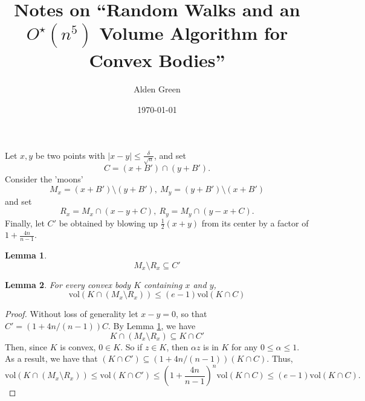 \documentclass{article}
\newcommand{\abs}[1]{\left \lvert #1 \right \rvert}
\newcommand{\vol}{\mathrm{vol}}
\newcommand{\1}{\mathbf{1}}
\theoremstyle{alden}
\theoremstyle{aldenthm}
\newtheorem{lemma}{Lemma}
\theoremstyle{remark}
\begin{document}
	
\title{Notes on ``Random Walks and an $O^{\star}(n^5)$ Volume Algorithm for Convex Bodies''}
\author{Alden Green}
\date{\today}
\maketitle

Let $x,y$ be two points with $\abs{x - y} \leq \frac{\delta}{\sqrt{n}}$, and set
\begin{equation*}
C = (x + B') \cap (y + B'). \tag{$B' = \delta B$}
\end{equation*}
Consider the 'moons'
\begin{equation*}
M_x = (x + B') \setminus (y + B'),~ M_y = (y + B') \setminus (x + B')
\end{equation*}
and set
\begin{equation*}
R_x = M_x \cap (x - y + C),~ R_y = M_y \cap(y - x + C).
\end{equation*}
Finally, let $C'$ be obtained by blowing up $\frac{1}{2}(x + y)$ from its center by a factor of $1 + \frac{4n}{n - 1}$. 

\begin{lemma}
	\label{lem: large_intersection_1}
	\begin{equation*}
	M_x \setminus R_x \subseteq C'
	\end{equation*}
\end{lemma}


\begin{lemma}
	\label{lem: large_intersection_2}
	For every convex body $K$ containing $x$ and $y$,
	\begin{equation*}
	\vol(K \cap (M_x \setminus R_x)) \leq (e - 1)\vol(K \cap C)
	\end{equation*}
\end{lemma}
\begin{proof}
	Without loss of generality let $x - y = 0$, so that $C' = (1 + 4n/(n-1))C$. By Lemma \ref{lem: large_intersection_1}, we have
	\begin{equation*}
	K \cap (M_x \setminus R_x) \subseteq K \cap C'
	\end{equation*}
	Then, since $K$ is convex, $0 \in K$. So if $z \in K$, then $\alpha z$ is in $K$ for any $0 \leq \alpha \leq 1$. As a result, we have that $(K \cap C') \subseteq (1 + 4n/(n-1)) (K \cap C)$. Thus,
	\begin{equation*}
	\vol(K \cap (M_x \setminus R_x)) \leq \vol(K \cap C') \leq (1 + \frac{4n}{n - 1})^n \vol(K \cap C) \leq (e - 1) \vol(K \cap C).
	\end{equation*}
\end{proof}
\end{document}
